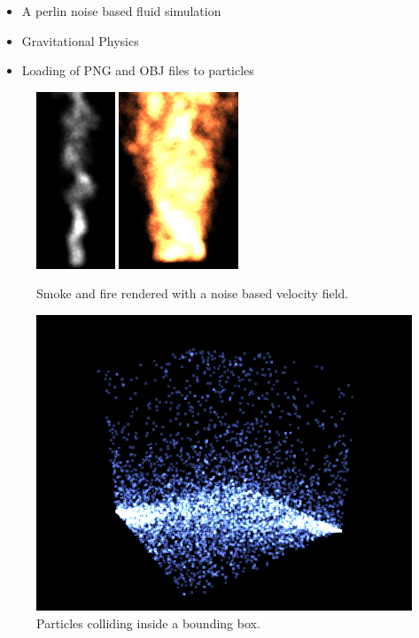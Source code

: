 \documentclass[report]{vgtc}
\begin{document}
\begin{itemize}
  \item A perlin noise based fluid simulation
  \item Gravitational Physics
  \item Loading of PNG and OBJ files to particles
\end{itemize}


\begin{figure}[H]
\includegraphics[height=200px]{img/smoke.png}
\includegraphics[height=200px]{img/fire.png}
\caption{Smoke and fire rendered with a noise based velocity field.}
\end{figure}

\begin{figure}[H]
\includegraphics[scale=0.57]{img/cube.png}
\caption{Particles colliding inside a bounding box.}
\end{figure}
\end{document}
